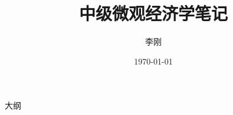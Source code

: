 \documentclass[UTF8]{ctexbeamer}
\title{中级微观经济学笔记}
\author{李刚}
\institute{中南财经政法大学}
\date{\today}
\begin{document}
\frame{\titlepage} 




\begin{frame}{大纲}
\begin{multicols}{2}
  \tableofcontents
\end{multicols}
\end{frame}

\end{document}
